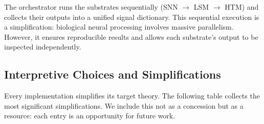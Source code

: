 The orchestrator runs the substrates sequentially (SNN $\rightarrow$ LSM $\rightarrow$ HTM) and collects their outputs into a unified signal dictionary. This sequential execution is a simplification: biological neural processing involves massive parallelism. However, it ensures reproducible results and allows each substrate's output to be inspected independently.

\subsection{Interpretive Choices and Simplifications}
\label{sec:simplifications}

Every implementation simplifies its target theory. The following table collects the most significant simplifications. We include this not as a concession but as a resource: each entry is an opportunity for future work.

